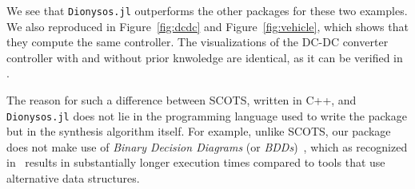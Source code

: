 \documentclass{juliacon}
\begin{document}
We see that \texttt{Dionysos.jl} outperforms the other packages for these two examples. We also reproduced \cite[Figures 3 and 4]{rungger2016scots} in Figure~\ref{fig:dcdc} and Figure~\ref{fig:vehicle}, which shows that they compute the same controller. The visualizations of the DC-DC converter controller with and without prior knwoledge are identical, as it can be verified in \cite{Calbert2024}.

\vskip 6pt

The reason for such a difference between SCOTS, written in C++, and \texttt{Dionysos.jl} does not lie in the programming language used to write the package but in the synthesis algorithm itself. For example, unlike SCOTS, our package does not make use of \emph{Binary Decision Diagrams} (or \emph{BDDs})~\cite{bryant1992symbolic}, which as recognized in~\cite{rungger2016scots} results in substantially longer execution times compared to tools that use alternative data structures. 
\end{document}
